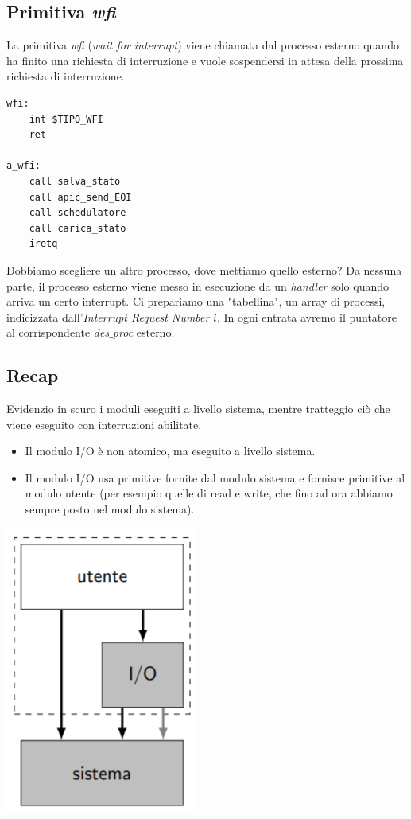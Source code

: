 \documentclass[11pt]{report}
\theoremstyle{definition}
\begin{document}
\subsection{Primitiva \emph{wfi}}
La primitiva \emph{wfi} (\emph{wait for interrupt}) viene chiamata dal processo esterno quando ha finito una richiesta di interruzione e vuole sospendersi in attesa della prossima richiesta di interruzione.
\begin{verbatim}
wfi:
    int $TIPO_WFI
    ret
	
a_wfi:
    call salva_stato 
    call apic_send_EOI
    call schedulatore
    call carica_stato
    iretq
\end{verbatim}
Dobbiamo scegliere un altro processo, dove mettiamo quello esterno? Da nessuna parte, il processo esterno viene messo in esecuzione da un \textit{handler} solo quando arriva un certo interrupt. Ci prepariamo una "tabellina", un array di processi, indicizzata dall'\emph{Interrupt Request Number} $i$. In ogni entrata avremo il puntatore al corrispondente \emph{des$\_$proc} esterno.



\subsection{Recap} Evidenzio in scuro i moduli eseguiti a livello sistema, mentre tratteggio ciò che viene eseguito con interruzioni abilitate.  
\begin{itemize}
	\item Il modulo I/O è non atomico, ma eseguito a livello sistema.
	\item Il modulo I/O usa primitive fornite dal modulo sistema e fornisce primitive al modulo utente (per esempio quelle di read e write, che fino ad ora abbiamo sempre posto nel modulo sistema). 
\end{itemize}	
\begin{center}
	\includegraphics[scale=.7]{img/280.PNG}
\end{center}
\end{document}
